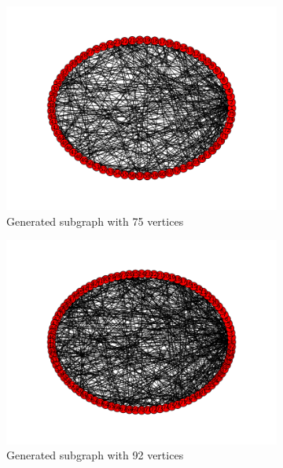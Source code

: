 \begin{figure}[!htbp]
\begin{subfigure}[b]{0.6\textwidth}
    \includegraphics[width=\textwidth]{75}
    \caption{Generated subgraph with 75 vertices}
    \label{fig:75}
  \end{subfigure}
  \hfill
  \begin{subfigure}[b]{0.6\textwidth}
    \includegraphics[width=\textwidth]{92}
    \caption{Generated subgraph with 92 vertices}
    \label{fig:92}
  \end{subfigure}
  \begin{subfigure}[b]{0.6\textwidth}

\end{subfigure}
\end{figure}
